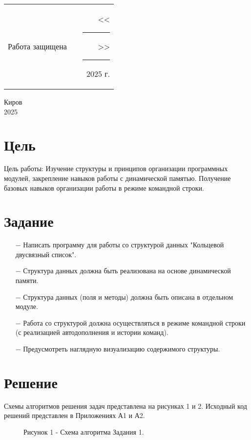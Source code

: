 \documentclass[oneside,a4paper,14pt]{extarticle}
\begin{document}
\noindent
\begin{tabular}{lp{58mm}r}
	Работа защищена &  & <<\rule[-1mm]{5mm}{0.10mm}\/>>\rule[-1mm]{30mm}{0.10mm}\ 2025 г.
\end{tabular}
\vfill

\begin{center}
	Киров\\
	2025
\end{center}

\newpage\thispagestyle{plain}

\section*{Цель}

Цель работы: Изучение структуры и принципов организации программных модулей, закрепление навыков работы с динамической памятью. Получение базовых навыков организации работы в режиме командной строки.

\section*{Задание}
\begin{itemize}
	\item[$-$] Написать программу для работы со структурой данных "Кольцевой двусвязный список".
	\item[$-$] Структура данных должна быть реализована на основе динамической памяти.
	\item[$-$] Структура данных (поля и методы) должна быть описана в отдельном модуле.
	\item[$-$] Работа со структурой должна осуществляться в режиме командной строки (с реализацией автодополнения и истории команд).
	\item[$-$] Предусмотреть наглядную визуализацию содержимого структуры.
\end{itemize}

\section*{Решение}

Схемы алгоритмов решения задач представлена на рисунках 1 и 2. Исходный код решений представлен в Приложениях А1 и А2.

\clearpage
\begin{figure}[H]
	\centering
	\caption*{Рисунок 1 - Схема алгоритма Задания 1.}
\end{figure}
\end{document}
